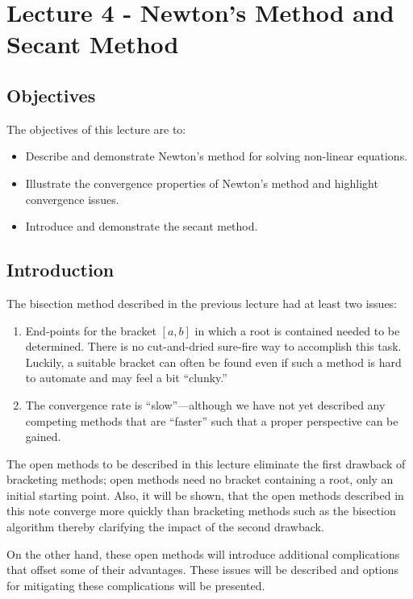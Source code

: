 \chapter{Lecture 4 - Newton's Method and Secant Method}
\label{ch:lec4n}
\section{Objectives}
The objectives of this lecture are to:
\begin{itemize}
\item Describe and demonstrate Newton's method for solving non-linear equations.
\item Illustrate the convergence properties of Newton's method and highlight convergence issues.
\item Introduce and demonstrate the secant method.
\end{itemize}
\setcounter{lstannotation}{0}

\section{Introduction}
The bisection method described in the previous lecture had at least two issues:
\begin{enumerate}
\item End-points for the bracket $\left[a,b\right]$ in which a root is contained needed to be determined.  There is no cut-and-dried sure-fire way to accomplish this task.  Luckily, a suitable bracket can often be found even if such a method is hard to automate and may feel a bit ``clunky.''

\item The convergence rate is ``slow''---although we have not yet described any competing methods that are ``faster'' such that a proper perspective can be gained.
\end{enumerate}
The open methods to be described in this lecture eliminate the first drawback of bracketing methods; open methods need no bracket containing a root, only an initial starting point.  Also, it will be shown, that the open methods described in this note converge more quickly than bracketing methods such as the bisection algorithm thereby clarifying the impact of the second drawback. 

On the other hand, these open methods will introduce additional complications that offset some of their advantages.  These issues will be described and options for mitigating these complications will be presented.


